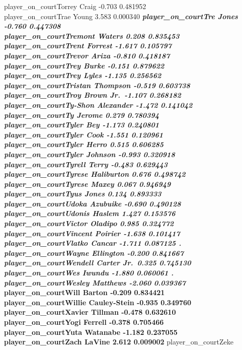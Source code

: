 \documentclass[
  landscape]{article}
\begin{document}
player\_on\_courtTorrey Craig -0.703 0.481952\\
player\_on\_courtTrae Young 3.583 0.000340 \textbf{\emph{
player\_on\_courtTre Jones -0.760 0.447308\\
player\_on\_courtTremont Waters 0.208 0.835453\\
player\_on\_courtTrent Forrest -1.617 0.105797\\
player\_on\_courtTrevor Ariza -0.810 0.418187\\
player\_on\_courtTrey Burke -0.151 0.879622\\
player\_on\_courtTrey Lyles -1.135 0.256562\\
player\_on\_courtTristan Thompson -0.519 0.603738\\
player\_on\_courtTroy Brown Jr.~-1.107 0.268182\\
player\_on\_courtTy-Shon Alexander -1.472 0.141042\\
player\_on\_courtTy Jerome 0.279 0.780394\\
player\_on\_courtTyler Bey -1.173 0.240801\\
player\_on\_courtTyler Cook -1.551 0.120961\\
player\_on\_courtTyler Herro 0.515 0.606285\\
player\_on\_courtTyler Johnson -0.993 0.320918\\
player\_on\_courtTyrell Terry -0.483 0.629443\\
player\_on\_courtTyrese Haliburton 0.676 0.498742\\
player\_on\_courtTyrese Maxey 0.067 0.946949\\
player\_on\_courtTyus Jones 0.134 0.893333\\
player\_on\_courtUdoka Azubuike -0.690 0.490128\\
player\_on\_courtUdonis Haslem 1.427 0.153576\\
player\_on\_courtVictor Oladipo 0.985 0.324772\\
player\_on\_courtVincent Poirier -1.638 0.101417\\
player\_on\_courtVlatko Cancar -1.711 0.087125 .\\
player\_on\_courtWayne Ellington -0.200 0.841667\\
player\_on\_courtWendell Carter Jr.~0.325 0.745130\\
player\_on\_courtWes Iwundu -1.880 0.060061 .\\
player\_on\_courtWesley Matthews -2.060 0.039367 }\\
player\_on\_courtWill Barton -0.209 0.834421\\
player\_on\_courtWillie Cauley-Stein -0.935 0.349760\\
player\_on\_courtXavier Tillman -0.478 0.632610\\
player\_on\_courtYogi Ferrell -0.378 0.705466\\
player\_on\_courtYuta Watanabe -1.182 0.237055\\
player\_on\_courtZach LaVine 2.612 0.009002 } player\_on\_courtZeke
\end{document}
